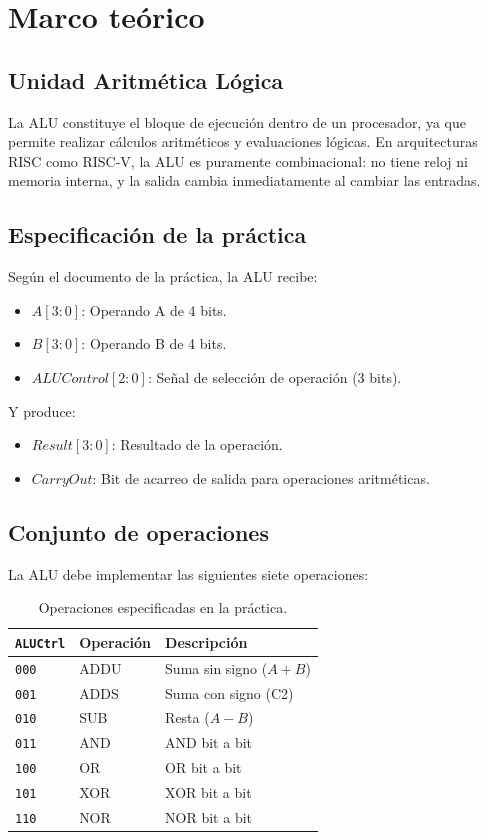 \documentclass[12pt,letterpaper]{article}
\begin{document}
\section{Marco teórico}

\subsection{Unidad Aritmética Lógica}
La ALU constituye el bloque de ejecución dentro de un procesador, ya que permite realizar cálculos aritméticos y evaluaciones lógicas.
En arquitecturas RISC como RISC-V, la ALU es puramente combinacional: no tiene reloj ni memoria interna, y la salida cambia inmediatamente al cambiar las entradas.

\subsection{Especificación de la práctica}
Según el documento de la práctica, la ALU recibe:
\begin{itemize}
  \item $A[3:0]$: Operando A de 4 bits.
  \item $B[3:0]$: Operando B de 4 bits.
  \item $ALUControl[2:0]$: Señal de selección de operación (3 bits).
\end{itemize}

Y produce:
\begin{itemize}
  \item $Result[3:0]$: Resultado de la operación.
  \item $CarryOut$: Bit de acarreo de salida para operaciones aritméticas.
\end{itemize}

\subsection{Conjunto de operaciones}
La ALU debe implementar las siguientes siete operaciones:

\begin{table}[H]
\centering
\caption{Operaciones especificadas en la práctica.}
\label{tab:ops_spec}
\begin{tabular}{C{1.8cm}ll}
\toprule
\texttt{ALUCtrl} & Operación & Descripción \\
\midrule
\texttt{000} & ADDU & Suma sin signo ($A+B$) \\
\texttt{001} & ADDS & Suma con signo (C2) \\
\texttt{010} & SUB  & Resta ($A-B$) \\
\texttt{011} & AND  & AND bit a bit \\
\texttt{100} & OR   & OR bit a bit \\
\texttt{101} & XOR  & XOR bit a bit \\
\texttt{110} & NOR  & NOR bit a bit \\
\bottomrule
\end{tabular}
\end{table}
\end{document}
